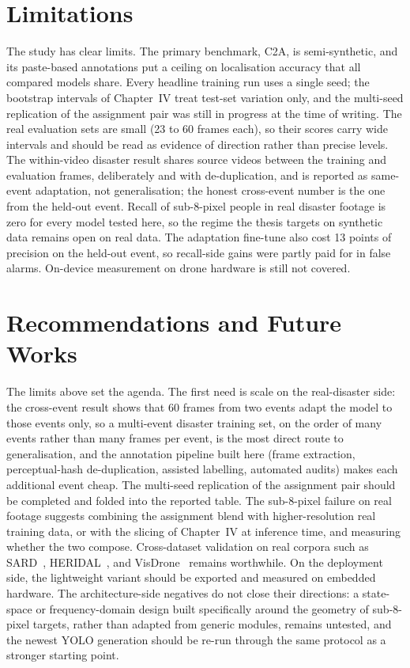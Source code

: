 \section{Limitations}
The study has clear limits. The primary benchmark, C2A, is semi-synthetic, and
its paste-based annotations put a ceiling on localisation accuracy that all
compared models share. Every headline training run uses a single seed; the
bootstrap intervals of Chapter~IV treat test-set variation only, and the
multi-seed replication of the assignment pair was still in progress at the time
of writing. The real evaluation sets are small (23 to 60 frames each), so their
scores carry wide intervals and should be read as evidence of direction rather
than precise levels. The within-video disaster result shares source videos
between the training and evaluation frames, deliberately and with de-duplication,
and is reported as same-event adaptation, not generalisation; the honest
cross-event number is the one from the held-out event. Recall of sub-8-pixel
people in real disaster footage is zero for every model tested here, so the
regime the thesis targets on synthetic data remains open on real data. The
adaptation fine-tune also cost 13 points of precision on the held-out event, so
recall-side gains were partly paid for in false alarms. On-device measurement on
drone hardware is still not covered.

\section{Recommendations and Future Works}
The limits above set the agenda. The first need is scale on the real-disaster
side: the cross-event result shows that 60 frames from two events adapt the
model to those events only, so a multi-event disaster training set, on the order
of many events rather than many frames per event, is the most direct route to
generalisation, and the annotation pipeline built here (frame extraction,
perceptual-hash de-duplication, assisted labelling, automated audits) makes each
additional event cheap. The multi-seed replication of the assignment pair should
be completed and folded into the reported table. The sub-8-pixel failure on real
footage suggests combining the assignment blend with higher-resolution real
training data, or with the slicing of Chapter~IV at inference time, and
measuring whether the two compose. Cross-dataset validation on real corpora such
as SARD~\cite{sambolek2021sard}, HERIDAL~\cite{bozic2019heridal}, and
VisDrone~\cite{zhu2021visdrone} remains worthwhile. On the deployment side, the
lightweight variant should be exported and measured on embedded hardware. The
architecture-side negatives do not close their directions: a state-space or
frequency-domain design built specifically around the geometry of sub-8-pixel
targets, rather than adapted from generic modules, remains untested, and the
newest YOLO generation should be re-run through the same protocol as a stronger
starting point.
